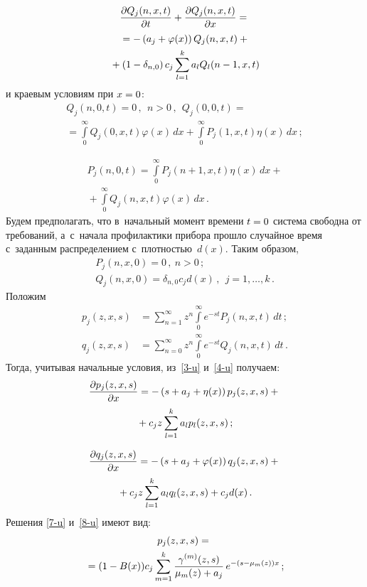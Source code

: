 \begin{multicols}{2}
\noindent
\begin{multline}
\label{4-u}
\displaystyle\frac{\displaystyle \partial Q_j(n,x,t)\mathstrut}{\displaystyle \partial t\mathstrut}+
\displaystyle\frac{\displaystyle \partial Q_j(n,x,t)\mathstrut}{\displaystyle \partial x\mathstrut}={}\\
{}=
-\left(a_j+\varphi(x)\right)Q_j(n,x,t)+{}\\
{}+
\left(1-\delta_{n,0}\right)c_j\sum\limits_{l=1}^ka_lQ_l(n-1,x,t)
\end{multline}
и краевым условиям при $x\hm=0$:
\begin{multline}
\label{5-u}
Q_j(n,0,t)=0\,,\ \ n>0\,,\ \ 
Q_j(0,0,t)={}\\
{}=\int\limits_0^{\infty}Q_j(0,x,t)\varphi(x)\,dx+
\int\limits_0^{\infty}P_j(1,x,t)\eta(x)\,dx\,;
\end{multline}

\vspace*{-12pt}

\noindent
\begin{multline}
\label{6-u}
P_j(n,0,t)=\int\limits_0^{\infty}P_j(n+1,x,t)\eta(x)\,dx+{}\\
{}+
\int\limits_0^{\infty}Q_j(n,x,t)\varphi(x)\,dx\,.
\end{multline}
Будем предполагать, что в~начальный момент времени $t\hm=0$ 
система свободна от требований, а~с~начала профилактики прибора 
прошло случайное время с~заданным распределением с~плот\-ностью~$d(x).$ Таким образом,
\begin{gather*}
P_j(n,x,0)=0\,,\ n>0\,;\\ 
Q_j(n,x,0)=\delta_{n,0}c_jd(x)\,,\ \ j=1,\ldots,k\,.
\end{gather*}
Положим
\begin{align*}
p_j(z,x,s)&=\sum\limits_{n=1}^{\infty}z^n\int\limits_0^{\infty}e^{-st}P_j(n,x,t)\,dt\,;
\\ 
q_j(z,x,s)&=\sum\limits_{n=0}^{\infty}z^n\int\limits_0^{\infty}e^{-st}Q_j(n,x,t)\,dt\,.
\end{align*}
Тогда, учитывая начальные условия,  из~\eqref{3-u} и~\eqref{4-u} получаем:
\begin{multline}
\label{7-u}
\displaystyle\frac{\displaystyle \partial p_j(z,x,s)\mathstrut}{\displaystyle \partial x\mathstrut}=
-\left(s+a_j+\eta(x)\right)p_j(z,x,s)+{}\\
{}+c_jz\sum\limits_{l=1}^ka_lp_l(z,x,s)\,;
\end{multline}

\vspace*{-12pt}

\noindent
\begin{multline}
\label{8-u}
\displaystyle\frac{\displaystyle \partial q_j(z,x,s)\mathstrut}{\displaystyle \partial x\mathstrut}=
-\left(s+a_j+\varphi(x)\right)q_j(z,x,s)+{}\\
{}+c_jz\sum\limits_{l=1}^ka_lq_l(z,x,s)+c_jd(x)\,.
\end{multline}
Решения \eqref{7-u} и~\eqref{8-u} имеют вид:
\begin{multline}
\label{9-u}
p_j(z,x,s)={}\\
{}= (1-B(x))c_j\sum\limits_{m=1}^k
\displaystyle\frac{\displaystyle \gamma^{(m)}(z,s)\mathstrut}{\displaystyle \mu_m(z)+a_j\mathstrut}\,e^{-(s-\mu_m(z))x}\,;
\end{multline}


\end{multicols}
